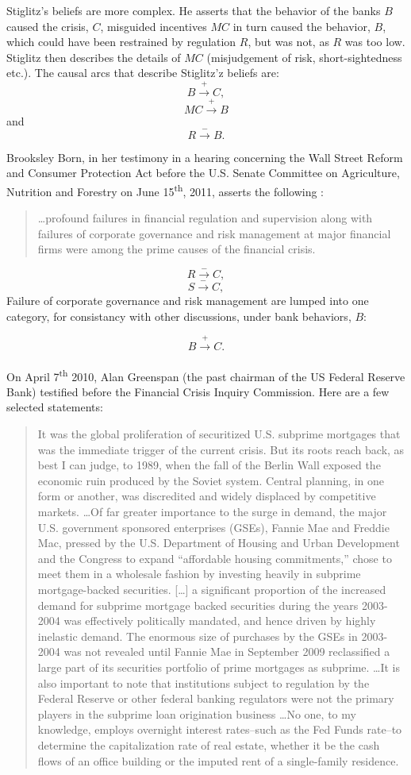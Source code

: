 \documentclass[12pt]{article}
\newcommand{\ts}{\textsuperscript}
\begin{document}
Stiglitz's beliefs are more complex. He asserts that the behavior of the banks $B$ caused the crisis, $C$, misguided incentives $MC$ in turn caused the behavior, $B$, which could have been restrained by regulation $R$, but was not, as $R$ was too low. Stiglitz then describes the details of $MC$ (misjudgement of risk, short-sightedness etc.). The causal arcs that describe Stiglitz'z beliefs are:
$$B \xrightarrow{+} C,$$
$$MC \xrightarrow{+} B$$
and
$$R \xrightarrow{-}B.$$

Brooksley Born, in her testimony in a hearing concerning the Wall Street Reform and Consumer Protection Act before the U.S. Senate Committee on Agriculture, Nutrition and Forestry on June 15\ts{th}, 2011, asserts the following :
\begin{quotation}
\ldots profound failures in financial regulation and supervision along with failures of corporate governance and risk management at major financial firms were among the prime causes of the financial crisis.
\end{quotation}
$$R \xrightarrow{-} C,$$
$$S \xrightarrow{-} C,$$
Failure of corporate governance and risk management are lumped into one category, for consistancy with other discussions, under bank behaviors, $B$:

$$B \xrightarrow{+} C.$$\\

On April 7\ts{th} 2010, Alan Greenspan (the past chairman of the US Federal Reserve Bank) testified before the Financial Crisis Inquiry Commission. Here are a few selected statements:

\begin{quotation}
It was the global proliferation of securitized U.S. subprime mortgages that was the immediate trigger of the current crisis. But its roots reach back, as best I can judge, to 1989, when the fall of the Berlin Wall exposed the economic ruin produced by the Soviet system. Central planning, in one form or another, was discredited and widely displaced by competitive markets. \ldots Of far greater importance to the surge in demand, the major U.S. government sponsored enterprises (GSEs), Fannie Mae and Freddie Mac, pressed by the U.S. Department of Housing and Urban Development and the Congress to expand ``affordable housing commitments,'' chose to meet them in a wholesale fashion by investing heavily in subprime mortgage-backed securities. [\ldots] a significant proportion of the increased demand for subprime mortgage backed securities during the years 2003-2004 was effectively politically mandated, and hence driven by highly inelastic demand. The enormous size of purchases by the GSEs in 2003-2004 was not revealed until Fannie Mae in September 2009 reclassified a large part of its securities portfolio of prime mortgages as subprime. \ldots It is also important to note that institutions subject to regulation by the Federal Reserve or other federal banking regulators were not the primary players in the subprime loan origination business \ldots No one, to my knowledge, employs overnight interest rates--such as the Fed Funds rate--to determine the
capitalization rate of real estate, whether it be the cash flows of an office building or the imputed rent of a single-family residence.
\end{quotation}
\end{document}
